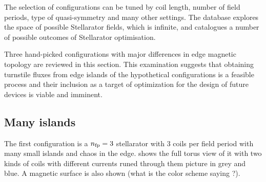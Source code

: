 The selection of configurations can be tuned by coil length, number of field periods, type of quasi-symmetry and many other settings. The database explores the space of possible Stellarator fields, which is infinite, and catalogues a number of possible outcomes of Stellarator optimisation. 

Three hand-picked configurations with major differences in edge magnetic topology are reviewed in this section. This examination suggests that obtaining turnstile fluxes from edge islands of the hypothetical configurations is a feasible process and their inclusion as a target of optimization for the design of future devices is viable and imminent.

\subsection{Many islands}\label{sec:quars-0229079}

The first configuration is a $n_\text{fp} = 3$ stellarator with 3 coils per field period with many small islands and chaos in the edge. \figref{\ref{fig:coils-0229079}} shows the full torus view of it with two kinds of coils with different currents runed through them picture in grey and blue. A magnetic surface is also shown (what is the color scheme saying ?).

